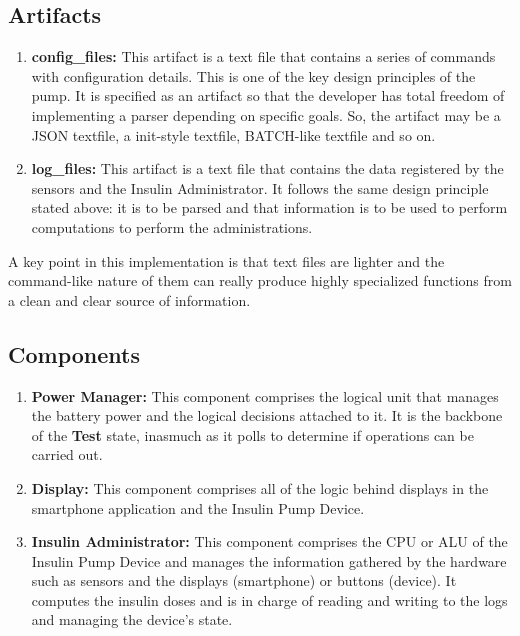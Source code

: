 \documentclass{scrreprt}
\begin{document}
\subsection{Artifacts}
\begin{enumerate}
    \item \textbf{config\_files:} This artifact is a text file that contains a series of commands with configuration details. This is one of the key design principles of the pump. It is specified as an artifact so that
        the developer has total freedom of implementing a parser depending on specific goals. So, the artifact may be a JSON textfile, a init-style textfile, BATCH-like textfile and so on.
    \item \textbf{log\_files:} This artifact is a text file that contains the data registered by the sensors and the Insulin Administrator. It follows the same design principle stated above: it is to be parsed and that
        information is to be used to perform computations to perform the administrations.
\end{enumerate}

A key point in this implementation is that text files are lighter and the command-like nature of them can really produce highly specialized functions from a clean and clear source of information.

\subsection{Components}
\begin{enumerate}
    \item \textbf{Power Manager:} This component comprises the logical unit that manages the battery power and the logical decisions attached to it. It is the backbone of the \textbf{Test} state, inasmuch as it polls
        to determine if operations can be carried out.
    \item \textbf{Display:} This component comprises all of the logic behind displays in the smartphone application and the Insulin Pump Device. 
    \item \textbf{Insulin Administrator:} This component comprises the CPU or ALU of the Insulin Pump Device and manages the information gathered by the hardware such as sensors and the displays (smartphone) or buttons
        (device). It computes the insulin doses and is in charge of reading and writing to the logs and managing the device's state.
\end{enumerate}
\end{document}
